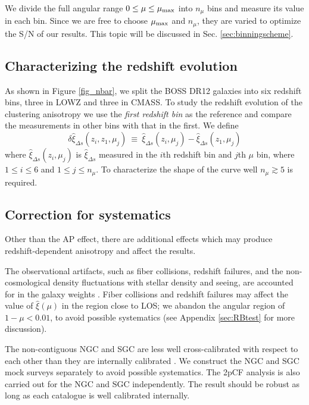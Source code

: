 \documentclass[iop]{emulateapj}
\begin{document}
We divide the full angular range $0\leq\mu\leq\mu_{\rm max}$ into $n_{\mu}$ bins and measure its value in each bin.
Since we are free to choose $\mu_{\rm max}$ and $n_{\mu}$,
they are varied to optimize the S/N of our results.
This topic will be discussed in Sec. \ref{sec:binningscheme}.

\subsection{Characterizing the redshift evolution}


As shown in Figure \ref{fig_nbar}, we split the BOSS DR12 galaxies into six redshift bins, three in LOWZ and three in CMASS.
To study the redshift evolution of the clustering anisotropy 
we use the {\it first redshift bin} as the reference and compare the measurements in other bins with that in the first.
We define
\begin{equation} \label{eq:deltahatxi}
\delta \hat\xi_{\Delta s}(z_i,z_1,\mu_j)\ \equiv\ \hat\xi_{\Delta s}(z_i,\mu_j) - \hat\xi_{\Delta s}(z_1,\mu_j)
\end{equation}
where $\hat\xi_{\Delta s}(z_i,\mu_j)$ is $\hat\xi_{\Delta s}$ measured in the $i$th redshift bin and $j$th $\mu$ bin,
where $1\leq i \leq 6$ and $1\leq j \leq n_{\mu}$.
To characterize the shape of the curve well $n_\mu \gtrsim5$ is required.

\subsection{Correction for systematics}\label{sec:syscor}

Other than the AP effect, there are additional effects 
which may produce redshift-dependent anisotropy and affect the results. 

The observational artifacts, such as fiber collisions, redshift failures, 
and the non-cosmological density fluctuations with stellar density and seeing,
are accounted for in the galaxy weights \citep{Reidetal:2016}.
Fiber collisions and redshift failures may affect the value of $\hat\xi(\mu)$ in the region close to LOS;
we abandon the angular region of $1-\mu<0.01$, 
to avoid possible systematics (see Appendix \ref{sec:RBtest} for more discussion). 

The non-contiguous NGC and SGC are less well cross-calibrated with respect to each other 
than they are internally calibrated \citep{Schlafly2010,SF2011,Parejko2013}.
We construct the NGC and SGC mock surveys separately to avoid possible systematics.
The 2pCF analysis is also carried out for the NGC and SGC independently.
The result should be robust as long as each catalogue is well calibrated internally.
\end{document}
